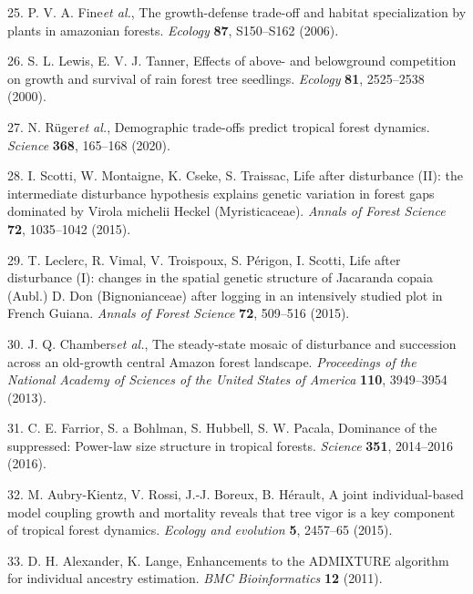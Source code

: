 \documentclass[
]{article}
\begin{document}
\leavevmode\hypertarget{ref-Fine2006}{}%
25. P. V. A. Fine\emph{et al.}, The growth-defense trade-off and habitat specialization by plants in amazonian forests. \emph{Ecology} \textbf{87}, S150--S162 (2006).

\leavevmode\hypertarget{ref-Lewis2000}{}%
26. S. L. Lewis, E. V. J. Tanner, Effects of above- and belowground competition on growth and survival of rain forest tree seedlings. \emph{Ecology} \textbf{81}, 2525--2538 (2000).

\leavevmode\hypertarget{ref-Ruger2019}{}%
27. N. Rüger\emph{et al.}, Demographic trade-offs predict tropical forest dynamics. \emph{Science} \textbf{368}, 165--168 (2020).

\leavevmode\hypertarget{ref-Scotti2015}{}%
28. I. Scotti, W. Montaigne, K. Cseke, S. Traissac, Life after disturbance (II): the intermediate disturbance hypothesis explains genetic variation in forest gaps dominated by Virola michelii Heckel (Myristicaceae). \emph{Annals of Forest Science} \textbf{72}, 1035--1042 (2015).

\leavevmode\hypertarget{ref-Leclerc2015}{}%
29. T. Leclerc, R. Vimal, V. Troispoux, S. Périgon, I. Scotti, Life after disturbance (I): changes in the spatial genetic structure of Jacaranda copaia (Aubl.) D. Don (Bignonianceae) after logging in an intensively studied plot in French Guiana. \emph{Annals of Forest Science} \textbf{72}, 509--516 (2015).

\leavevmode\hypertarget{ref-Chambers2013}{}%
30. J. Q. Chambers\emph{et al.}, The steady-state mosaic of disturbance and succession across an old-growth central Amazon forest landscape. \emph{Proceedings of the National Academy of Sciences of the United States of America} \textbf{110}, 3949--3954 (2013).

\leavevmode\hypertarget{ref-Farrior2016}{}%
31. C. E. Farrior, S. a Bohlman, S. Hubbell, S. W. Pacala, Dominance of the suppressed: Power-law size structure in tropical forests. \emph{Science} \textbf{351}, 2014--2016 (2016).

\leavevmode\hypertarget{ref-Aubry-Kientz2015}{}%
32. M. Aubry-Kientz, V. Rossi, J.-J. Boreux, B. Hérault, A joint individual-based model coupling growth and mortality reveals that tree vigor is a key component of tropical forest dynamics. \emph{Ecology and evolution} \textbf{5}, 2457--65 (2015).

\leavevmode\hypertarget{ref-Alexander2011}{}%
33. D. H. Alexander, K. Lange, Enhancements to the ADMIXTURE algorithm for individual ancestry estimation. \emph{BMC Bioinformatics} \textbf{12} (2011).
\end{document}
